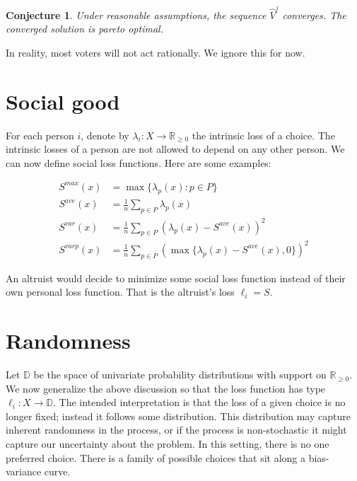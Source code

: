 \documentclass{article}
\newcommand{\loss}{\ell}
\newcommand{\sloss}{S}
\newcommand{\slossave}{\sloss^{\textit{ave}}}
\newcommand{\slossmax}{\sloss^{\textit{max}}}
\newcommand{\slossvar}{\sloss^\textit{var}}
\newcommand{\slossvarp}{\sloss^\textit{varp}}
\newcommand{\x}{x}
\newcommand{\V}{V}
\newcommand{\Vhat}{\hat\V}
\newcommand{\D}{\mathbb{D}}
\newcommand{\R}{\mathbb{R}}
\newcommand{\Rnn}{\R_{\ge0}}
\newtheorem{conj}{Conjecture}
\theoremstyle{definition}
\begin{document}
\begin{conj}
Under reasonable assumptions, the sequence $\Vhat^j$ converges.
The converged solution is pareto optimal.
\end{conj}
In reality, most voters will not act rationally.
We ignore this for now.


\section{Social good}

For each person $i$, denote by $\lambda_i : X \to \Rnn$ the intrinsic loss of a choice.
The intrinsic losses of a person are not allowed to depend on any other person.
We can now define social loss functions.
Here are some examples:

\begin{align}
\slossmax(x) &= \max \{ \lambda_p (\x) : p \in P \}
\\
\slossave(x) &= \frac{1}{n}\sum_{p\in P} \lambda_p (\x)
\\
\slossvar(x) &= \frac{1}{n}\sum_{p\in P} (\lambda_p(\x) - \slossave(x))^2
\\
\slossvarp(x) &= \frac{1}{n}\sum_{p\in P} (\max\{\lambda_p(\x) - \slossave(x),0\})^2
\end{align}

%


An altruist would decide to minimize some social loss function instead of their own personal loss function.
That is the altruist's loss $\loss_i = S$.


\section{Randomness}

Let $\D$ be the space of univariate probability distributions with support on $\Rnn$.
We now generalize the above discussion so that the loss function has type $\loss_i : X \to \D$.
The intended interpretation is that the loss of a given choice is no longer fixed;
instead it follows some distribution.
This distribution may capture inherent randomness in the process,
or if the process is non-stochastic it might capture our uncertainty about the problem.
In this setting, there is no one preferred choice.
There is a family of possible choices that sit along a bias-variance curve.
\end{document}
